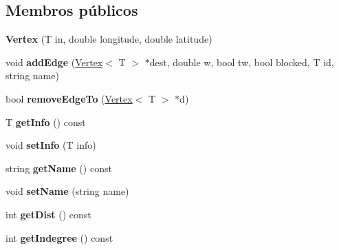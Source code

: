 \subsection*{Membros públicos}
\begin{DoxyCompactItemize}
\item 
\hypertarget{class_vertex_a32481367e36d2162714bc411f31b5f8f}{}{\bfseries Vertex} (T in, double longitude, double latitude)\label{class_vertex_a32481367e36d2162714bc411f31b5f8f}

\item 
\hypertarget{class_vertex_a40b147df89a89885a06fd9c3912c6dd5}{}void {\bfseries add\+Edge} (\hyperlink{class_vertex}{Vertex}$<$ T $>$ $\ast$dest, double w, bool tw, bool blocked, T id, string name)\label{class_vertex_a40b147df89a89885a06fd9c3912c6dd5}

\item 
\hypertarget{class_vertex_ab2b5b43fb1709a901b78718436763a84}{}bool {\bfseries remove\+Edge\+To} (\hyperlink{class_vertex}{Vertex}$<$ T $>$ $\ast$d)\label{class_vertex_ab2b5b43fb1709a901b78718436763a84}

\item 
\hypertarget{class_vertex_a5880b4b252ae6818819c2f9645784b59}{}T {\bfseries get\+Info} () const \label{class_vertex_a5880b4b252ae6818819c2f9645784b59}

\item 
\hypertarget{class_vertex_a31cd60c26640f8072a928ba70eb2f95e}{}void {\bfseries set\+Info} (T info)\label{class_vertex_a31cd60c26640f8072a928ba70eb2f95e}

\item 
\hypertarget{class_vertex_a878c08e3eca2b53b173fa8c1fa77227d}{}string {\bfseries get\+Name} () const \label{class_vertex_a878c08e3eca2b53b173fa8c1fa77227d}

\item 
\hypertarget{class_vertex_aee1d15f2efc9c7baecff72265beb1acf}{}void {\bfseries set\+Name} (string name)\label{class_vertex_aee1d15f2efc9c7baecff72265beb1acf}

\item 
\hypertarget{class_vertex_a3379c6cbcf1eaacc098381e3557a0b52}{}int {\bfseries get\+Dist} () const \label{class_vertex_a3379c6cbcf1eaacc098381e3557a0b52}

\item 
\hypertarget{class_vertex_a305ef01582f945f22134abb9294fe1f3}{}int {\bfseries get\+Indegree} () const \label{class_vertex_a305ef01582f945f22134abb9294fe1f3}


\end{DoxyCompactItemize}
